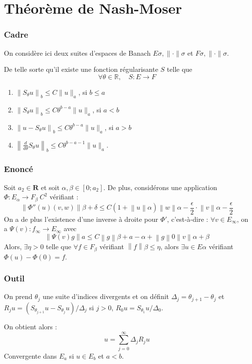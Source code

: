 \documentclass[10pt]{beamer}
\begin{document}
\section{Théorème de Nash-Moser}
\begin{frame}
\frametitle{Cadre}
On considère ici deux suites d'espaces de Banach ${E}\sigma, \lVert \cdot \rVert\sigma$ et ${F}\sigma, \lVert \cdot \rVert\sigma$.

De telle sorte qu'il existe une fonction régularisante $S$ telle que 
\[
\forall \theta \in \mathbb{R}, \quad S : E \to F 
\]

\begin{enumerate}
    \item $\left\|S_\theta u\right\|_b \leq C\|u\|_a$, si $b \leq a$
    \item $\left\|S_\theta u\right\|_b \leq C \theta^{b-a}\|u\|_a$, si $a < b$
    \item $\left\|u-S_\theta u\right\|_b \leq C \theta^{b-a}\|u\|_a$, si $a > b$
    \item $\left\|\frac{d}{d \theta} S_\theta u\right\|_b \leq C \theta^{b-a-1}\|u\|_a$.
\end{enumerate}
\end{frame}

\begin{frame}
\frametitle{Enoncé }
Soit $a_2 \in \mathbf{R}$ et soit $\alpha , \beta \in [0;a_2 ]$.
De plus, considérons une application $\Phi : E_\alpha \to F_\beta \: C^2 $ vérifiant :
\[ \left\|\Phi '' (u)(v,w) \right\|{\beta + \delta} \leq C ( 1 +\left\|u \right\|\alpha ) \left\|w \right\|{\alpha - \frac{\epsilon}{2} } \cdot \left\| v \right\|{\alpha - \frac{\epsilon}{2}} \]  
On a de plus l'existence d'une inverse à droite pour $\Phi' $, c'est-à-dire :
$\forall v \in E_\infty$, on a $\Psi (v): f_\infty \to E_\infty $ avec 
\[ \left\| \Psi(v)g \right\|a \leq C \left\| g \right\|{\beta + a - \alpha }+ \left\| g \right\|0 \left\| v \right\|{\alpha + \beta} \]
Alors, $\exists \eta > 0 $ telle que $\forall f \in F_\beta$ vérifiant $ \left\| f \right\|\beta \leq \eta$, alors $\exists u \in E\alpha$ vérifiant $ \Phi(u)-\Phi(0)=f$.
\end{frame}

\begin{frame}
\frametitle{Outil}
On prend $\theta_j$ une suite d'indices divergents et on définit $\Delta_j= \theta_{j+1} - \theta_{j}$ et $R_j u=\left(S_{\theta_{j+1}} u-S_{\theta_j} u\right) / \Delta_j$ si $j>0$, $R_0 u=S_{\theta_1} u / \Delta_0$.

On obtient alors :
\[ u=\sum_{j=0}^{\infty} \Delta_j R_j u \]
Convergente dans $E_a$ si $u \in E_b$ et $a < b$.
\end{frame}
\end{document}
